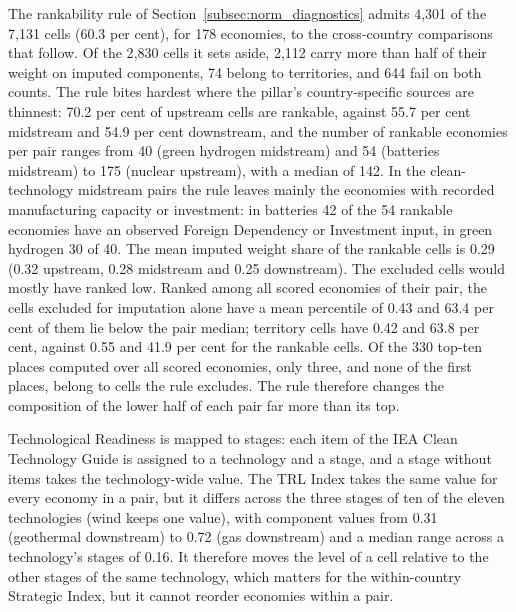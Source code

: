 The rankability rule of Section~\ref{subsec:norm_diagnostics} admits 4{,}301 of the 7{,}131 cells
(60.3 per cent), for 178 economies, to the cross-country comparisons that follow. Of the 2{,}830
cells it sets aside, 2{,}112 carry more than half of their weight on imputed components, 74 belong
to territories, and 644 fail on both counts. The rule bites hardest where the pillar's
country-specific sources are thinnest: 70.2 per cent of upstream cells are rankable, against 55.7
per cent midstream and 54.9 per cent downstream, and the number of rankable economies per pair
ranges from 40 (green hydrogen midstream) and 54 (batteries midstream) to 175 (nuclear upstream),
with a median of 142. In the clean-technology midstream pairs the rule leaves mainly the economies with recorded manufacturing capacity or investment: in batteries 42 of the 54
rankable economies have an observed Foreign Dependency or Investment input, in green hydrogen 30
of 40. The mean imputed weight share of the rankable cells is 0.29 (0.32 upstream, 0.28 midstream
and 0.25 downstream). The excluded cells would mostly have ranked low. Ranked among all scored
economies of their pair, the cells excluded for imputation alone have a mean percentile of 0.43
and 63.4 per cent of them lie below the pair median; territory cells have 0.42 and 63.8 per cent,
against 0.55 and 41.9 per cent for the rankable cells. Of the 330 top-ten places computed over all
scored economies, only three, and none of the first places, belong to cells the rule excludes. The
rule therefore changes the composition of the lower half of each pair far more than its top.

Technological Readiness is mapped to stages: each item of the IEA Clean Technology Guide is
assigned to a technology and a stage, and a stage without items takes the technology-wide value.
The TRL Index takes the same value for every economy in a pair, but it differs across the three
stages of ten of the eleven technologies (wind keeps one value), with component values from 0.31
(geothermal downstream) to 0.72 (gas downstream) and a median range across a technology's stages
of 0.16. It therefore moves the level of a cell relative to the other stages of the same
technology, which matters for the within-country Strategic Index, but it cannot reorder economies
within a pair.

